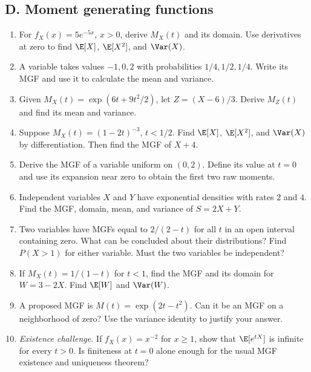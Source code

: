 \subsection{D. Moment generating functions}
\begin{enumerate}[label=\textbf{D\arabic*.},leftmargin=*,itemsep=0.75em]
\item For $f_X(x)=5e^{-5x}$, $x>0$, derive $M_X(t)$ and its domain. Use derivatives at zero to find $\E[X]$, $\E[X^2]$, and $\Var(X)$.
\item A variable takes values $-1,0,2$ with probabilities $1/4,1/2,1/4$. Write its MGF and use it to calculate the mean and variance.
\item Given $M_X(t)=\exp(6t+9t^2/2)$, let $Z=(X-6)/3$. Derive $M_Z(t)$ and find its mean and variance.
\item Suppose $M_X(t)=(1-2t)^{-3}$, $t<1/2$. Find $\E[X]$, $\E[X^2]$, and $\Var(X)$ by differentiation. Then find the MGF of $X+4$.
\item Derive the MGF of a variable uniform on $(0,2)$. Define its value at $t=0$ and use its expansion near zero to obtain the first two raw moments.
\item Independent variables $X$ and $Y$ have exponential densities with rates $2$ and $4$. Find the MGF, domain, mean, and variance of $S=2X+Y$.
\item Two variables have MGFs equal to $2/(2-t)$ for all $t$ in an open interval containing zero. What can be concluded about their distributions? Find $P(X>1)$ for either variable. Must the two variables be independent?
\item If $M_X(t)=1/(1-t)$ for $t<1$, find the MGF and its domain for $W=3-2X$. Find $\E[W]$ and $\Var(W)$.
\item A proposed MGF is $M(t)=\exp(2t-t^2)$. Can it be an MGF on a neighborhood of zero? Use the variance identity to justify your answer.
\item \textit{Existence challenge.} If $f_X(x)=x^{-2}$ for $x\geq1$, show that $\E[e^{tX}]$ is infinite for every $t>0$. Is finiteness at $t=0$ alone enough for the usual MGF existence and uniqueness theorem?
\end{enumerate}

